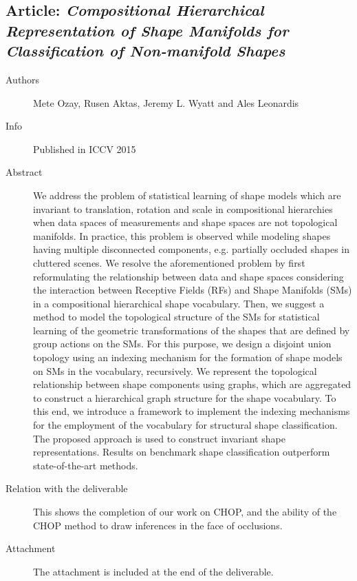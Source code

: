 \documentclass[a4paper,11pt,pdf]{../templates/pacmanreport}
\begin{document}
\subsection{Article: \em Compositional Hierarchical Representation of Shape Manifolds for Classification
of Non-manifold Shapes}
\begin{description}
    \item[Authors] Mete Ozay, Rusen Aktas, Jeremy L. Wyatt and Ales Leonardis
    \item[Info] Published in ICCV 2015 %
    \item[Abstract] We address the problem of statistical learning of shape models which are invariant to translation, rotation and scale in compositional hierarchies when data spaces of measurements and shape spaces are not topological manifolds. In practice, this problem is observed while modeling shapes having multiple disconnected components, e.g.
partially occluded shapes in cluttered scenes. We resolve the aforementioned problem by first reformulating the relationship between data and shape spaces considering the interaction between Receptive Fields (RFs) and Shape Manifolds (SMs) in a compositional hierarchical shape vocabulary. Then, we suggest a method to model the topological
structure of the SMs for statistical learning of the geometric transformations of the shapes that are defined by group
actions on the SMs. For this purpose, we design a disjoint union topology using an indexing mechanism for the formation of shape models on SMs in the vocabulary, recursively. We represent the topological relationship between
shape components using graphs, which are aggregated to construct a hierarchical graph structure for the shape vocabulary. To this end, we introduce a framework to implement the indexing mechanisms for the employment of the vocabulary for structural shape classification. The proposed approach is used to construct invariant shape representations. Results on benchmark shape classification outperform state-of-the-art methods.
\item [Relation with the deliverable] This shows the completion of our work on CHOP, and the ability of the CHOP method to draw inferences in the face of occlusions.
\item[Attachment] The attachment is included at the end of the deliverable. %
\end{description}
\newpage
\end{document}
